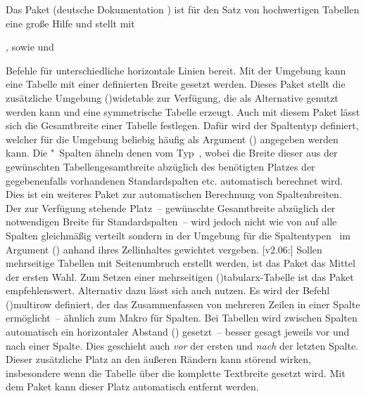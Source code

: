 \begin{DeclarePackages}[Tabellen|?]
  Das Paket  (deutsche Dokumentation ) 
  ist für den Satz von hochwertigen Tabellen eine große Hilfe und stellt mit
  \begin{Entity}{}
  ,  sowie  und 
  \end{Entity}
  Befehle für unterschiedliche horizontale Linien bereit.
  Mit der Umgebung  kann eine Tabelle mit einer 
  definierten Breite gesetzt werden. Dieses Paket stellt die zusätzliche
  Umgebung \Environment(){widetable} zur Verfügung, 
  die als Alternative genutzt werden kann und eine symmetrische Tabelle erzeugt.
  Auch mit diesem Paket lässt sich die Gesamtbreite einer Tabelle festlegen.
  Dafür wird der Spaltentyp  definiert, welcher für die Umgebung 
  beliebig häufig als Argument
  ()
  angegeben werden kann.
  Die "~Spalten ähneln denen vom Typ~, 
  wobei die Breite dieser aus der gewünschten Tabellengesamtbreite abzüglich 
  des benötigten Platzes der gegebenenfalls vorhandenen Standardspalten 
   etc. automatisch berechnet wird.
  Dies ist ein weiteres Paket zur automatischen Berechnung von Spaltenbreiten. 
  Der zur Verfügung stehende Platz~-- gewünschte Gesamtbreite abzüglich der 
  notwendigen Breite für Standardspalten~-- wird jedoch nicht wie von 
   auf alle Spalten gleichmäßig verteilt sondern in der 
  Umgebung 
  für die Spaltentypen~ im Argument
  ()
  anhand ihres Zellinhaltes gewichtet vergeben.
[v2.06:]
  Sollen mehrseitige Tabellen mit Seitenumbruch erstellt werden, ist das Paket
   das Mittel der ersten Wahl. Zum Setzen einer mehrseitigen 
  \Environment(){tabularx}-Tabelle
  ist das Paket  empfehlenswert. Alternativ dazu lässt sich 
  auch  nutzen.
  Es wird der Befehl \Macro(){multirow} definiert, der 
  das Zusammenfassen von mehreren Zeilen in einer Spalte ermöglicht~-- ähnlich 
  zum Makro  für Spalten.
  Bei Tabellen wird zwischen Spalten automatisch ein horizontaler Abstand 
  () gesetzt~-- besser gesagt jeweils vor und nach einer 
  Spalte. Dies geschieht auch \emph{vor} der ersten und \emph{nach} der letzten 
  Spalte. Dieser zusätzliche Platz an den äußeren Rändern kann störend wirken, 
  insbesondere wenn die Tabelle über die komplette Textbreite gesetzt wird. Mit 
  dem Paket  kann dieser Platz automatisch entfernt 
  werden.
  

\end{DeclarePackages}
